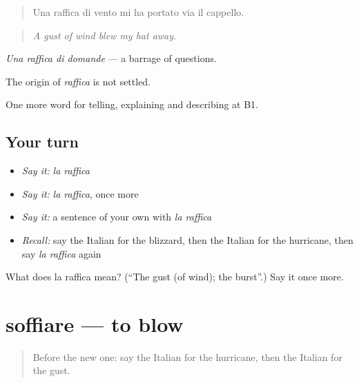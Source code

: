 \begin{quote}
Una raffica di vento mi ha portato via il cappello.
\end{quote}

\begin{quote}
\emph{A gust of wind blew my hat away.}
\end{quote}

\emph{Una raffica di domande} — a barrage of questions.

\begin{cousinweb}
The origin of \emph{raffica} is not settled.
\end{cousinweb}

\begin{grammarlens}[title={What you've built}]
One more word for telling, explaining and describing at B1.
\end{grammarlens}

\subsection*{Your turn}
\begin{itemize}
\raggedright
  \item \emph{Say it:} \emph{la raffica}
  \item \emph{Say it:} \emph{la raffica}, once more
  \item \emph{Say it:} a sentence of your own with \emph{la raffica}
  \item \emph{Recall:} say the Italian for the blizzard, then the Italian for the hurricane, then say \emph{la raffica} again
\end{itemize}

\begin{tcolorbox}[breakable,colback=teal!4,colframe=teal!35!black,title={Before you move on}]
What does la raffica mean? (\textquotedblleft{}The gust (of wind); the burst\textquotedblright{}.) Say it once more.
\end{tcolorbox}
\section[soffiare]{soffiare — to blow}

\label{lesson:IT-C469-soffiare}



\begin{quote}
Before the new one: say the Italian for the hurricane, then the Italian for the gust.
\end{quote}

